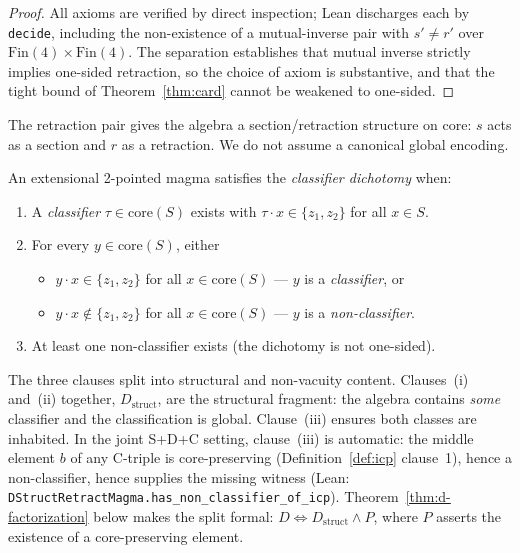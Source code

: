 \documentclass[sigconf,screen]{acmart}
\newcommand{\dotop}{\cdot}
\newcommand{\Fin}{\mathrm{Fin}}
\newcommand{\core}{\mathrm{core}}
\theoremstyle{remark}
\begin{document}
\begin{proof}
All axioms are verified by direct inspection; Lean discharges each by
\texttt{decide}, including the non-existence of a mutual-inverse pair
with $s' \neq r'$ over $\Fin(4) \times \Fin(4)$. The separation
establishes that mutual inverse strictly implies one-sided retraction,
so the choice of axiom is substantive, and that the tight bound of
Theorem~\ref{thm:card} cannot be weakened to one-sided.
\end{proof}

The retraction pair gives the algebra a section/retraction structure on
core: $s$ acts as a section and $r$ as a retraction. We do not assume a
canonical global encoding.

\begin{definition}
\label{def:cd}
An extensional 2-pointed magma satisfies the \emph{classifier dichotomy}
when:
\begin{enumerate}
  \item A \emph{classifier} $\tau \in \core(S)$ exists with
    $\tau \dotop x \in \{z_1, z_2\}$ for all $x \in S$.
  \item For every $y \in \core(S)$, either
    \begin{itemize}
      \item $y \dotop x \in \{z_1, z_2\}$ for all $x \in \core(S)$ ---
        $y$ is a \emph{classifier}, or
      \item $y \dotop x \notin \{z_1, z_2\}$ for all $x \in \core(S)$ ---
        $y$ is a \emph{non-classifier}.
    \end{itemize}
  \item At least one non-classifier exists (the dichotomy is not
    one-sided).
\end{enumerate}
\end{definition}

The three clauses split into structural and non-vacuity content.
Clauses~(i) and~(ii) together, $D_{\mathrm{struct}}$, are the structural
fragment: the algebra contains \emph{some} classifier and the
classification is global. Clause~(iii) ensures both classes are
inhabited. In the joint S+D+C setting, clause~(iii) is automatic: the
middle element $b$ of any C-triple is core-preserving (Definition~\ref{def:icp}
clause~1), hence a non-classifier, hence supplies the missing witness
(Lean: \texttt{DStructRetractMagma.has\_non\_classifier\_of\_icp}).
Theorem~\ref{thm:d-factorization} below makes the split formal:
$D \iff D_{\mathrm{struct}} \wedge P$, where $P$ asserts the existence
of a core-preserving element.
\end{document}
